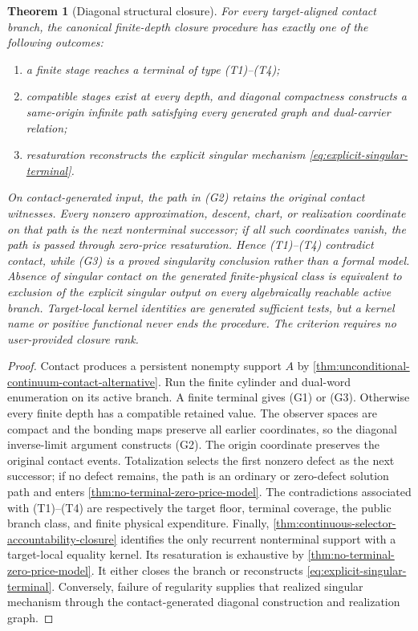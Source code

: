 \documentclass[11pt]{article}
\numberwithin{section}{part}
\theoremstyle{plain}
\newtheorem{theorem}{Theorem}[section]
\theoremstyle{definition}
\theoremstyle{remark}
\begin{document}
\begin{theorem}[Diagonal structural closure]
\label{thm:ranked-structural-closure}
For every target-aligned contact branch, the canonical finite-depth closure
procedure has exactly one of the following outcomes:
\begin{enumerate}[label=\textup{(G\arabic*)}]
\item a finite stage reaches a terminal of type \textup{(T1)}--\textup{(T4)};
\item compatible stages exist at every depth, and diagonal compactness
constructs a same-origin infinite path satisfying every generated graph and
dual-carrier relation;
\item resaturation reconstructs the explicit singular mechanism
\eqref{eq:explicit-singular-terminal}.
\end{enumerate}
On contact-generated input, the path in \textup{(G2)} retains the original
contact witnesses.  Every nonzero approximation, descent, chart, or
realization coordinate on that path is the next nonterminal successor; if all
such coordinates vanish, the path is passed through zero-price resaturation.
Hence \textup{(T1)}--\textup{(T4)} contradict contact, while
\textup{(G3)} is a proved singularity conclusion rather than a formal model.
Absence of singular contact on the generated finite-physical class is
equivalent to exclusion of the explicit singular output on every
algebraically reachable active branch.  Target-local
kernel identities are generated sufficient tests, but a kernel name or
positive functional never ends the procedure.  The criterion requires no
user-provided closure rank.
\end{theorem}

\begin{proof}
Contact produces a persistent nonempty support \(A\) by
\cref{thm:unconditional-continuum-contact-alternative}.  Run the finite
cylinder and dual-word enumeration on its active branch.  A finite terminal
gives \textup{(G1)} or \textup{(G3)}.  Otherwise every finite depth has a
compatible retained value.  The observer spaces are compact and the bonding
maps preserve all earlier coordinates, so the diagonal inverse-limit argument
constructs \textup{(G2)}.  The origin coordinate preserves the original
contact events.  Totalization selects the first nonzero defect as the next
successor; if no defect remains, the path is an ordinary or zero-defect
solution path and enters \cref{thm:no-terminal-zero-price-model}.  The
contradictions associated with
\textup{(T1)}--\textup{(T4)} are respectively the target floor, terminal
coverage, the public branch class, and finite physical expenditure.  Finally,
\cref{thm:continuous-selector-accountability-closure} identifies the only
recurrent nonterminal support with a target-local equality kernel.  Its
resaturation is exhaustive by
\cref{thm:no-terminal-zero-price-model}.  It either closes the branch or
reconstructs \eqref{eq:explicit-singular-terminal}.  Conversely, failure of
regularity supplies that realized singular mechanism through the
contact-generated diagonal construction and realization graph.
\end{proof}
\end{document}
